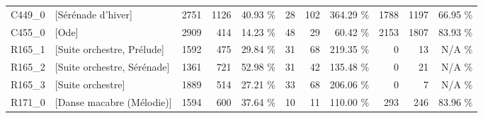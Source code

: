 \begin{small}
\begin{tabular}{l|l|r|r|r|r|r|r|r|r|r}
 C449\_0 & [Sérénade d'hiver] & 2751 & 1126 & 40.93 \%& 28 & 102 & 364.29 \%& 1788 & 1197 & 66.95 \% \\ 
 C455\_0 & [Ode] & 2909 & 414 & 14.23 \%& 48 & 29 & 60.42 \%& 2153 & 1807 & 83.93 \% \\ 
 R165\_1 & [Suite orchestre, Prélude]& 1592 & 475 & 29.84 \%& 31 & 68 & 219.35 \%& 0 & 13 & N/A \% \\ 
 R165\_2 & [Suite orchestre, Sérénade]& 1361 & 721 & 52.98 \%& 31 & 42 & 135.48 \%& 0 & 21 & N/A \% \\ 
 R165\_3 & [Suite orchestre]& 1889 & 514 & 27.21 \%& 33 & 68 & 206.06 \%& 0 & 7 & N/A \% \\ 
 R171\_0 & [Danse macabre (Mélodie)] & 1594 & 600 & 37.64 \%& 10 & 11 & 110.00 \%& 293 & 246 & 83.96 \% \\ 
 \hline
\end{tabular}
\end{small}
	